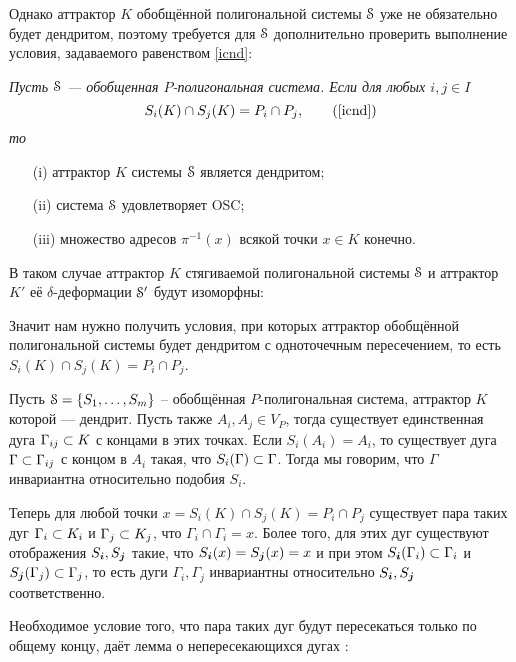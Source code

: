 Однако аттрактор $K$ обобщённой полигональной системы ${\EuScript S}$ уже не обязательно будет дендритом, поэтому требуется для ${\EuScript S}$ дополнительно проверить выполнение условия, задаваемого равенством \eqref{icnd}:\\


{\em Пусть ${\EuScript S}$ --- обобщенная $P$-полигональная система.  
Если для любых $i, j \in I$ 
\begin{equation}
S_i(K)\cap S_j(K)=P_i\cap P_j,\tag{\ref{icnd}}
\end{equation} 
то 
\begin{itemize}[nolistsep]
    \item[(i)] аттрактор $K$ системы ${\EuScript S}$ является дендритом;
    \item[(ii)] система ${\EuScript S}$ удовлетворяет OSC;
    \item[(iii)] множество адресов $\pi^{-1}(x)$ всякой точки $x\in K$ конечно.
\end{itemize}}

В таком случае аттрактор $K$ стягиваемой полигональной системы ${\EuScript S}$ и аттрактор $K'$ её $\delta$-деформации ${\EuScript S}'$ будут изоморфны:


Значит нам нужно получить условия, при которых аттрактор обобщённой полигональной системы будет дендритом с одноточечным пересечением, то есть $S_i(K)\cap S_j(K)=P_i\cap P_j$.


Пусть ${\EuScript S}=\{S_1,\ldots,S_m\}$ -- обобщённая $P$-полигональная система, аттрактор $K$ которой --- дендрит.
Пусть также $A_i,A_j\in V_P$, тогда существует единственная дуга $\Gamma_{ij}\subset K$ с концами в этих точках.
Если $S_i(A_i)=A_i$, то существует дуга $\Gamma\subset\Gamma_{ij}$ с концом в $A_i$ такая, что $S_i(\Gamma)\subset\Gamma$.
Тогда мы говорим, что $\Gamma$ инвариантна относительно подобия $S_i$.

Теперь для любой точки $x=S_i(K)\cap S_j(K)=P_i\cap P_j$ существует пара таких дуг $\Gamma_i\subset K_i$ и $\Gamma_j\subset K_j$, что $\Gamma_i\cap\Gamma_i=x$.
Более того, для этих дуг существуют отображения $S_{\bm{i}}, S_{\bm{j}}$ такие, что $S_{\bm{i}}(x)=S_{\bm{j}}(x)=x$ и при этом $S_{\bm{i}}(\Gamma_i)\subset\Gamma_i$ и $S_{\bm{j}}(\Gamma_j)\subset\Gamma_j$, то есть дуги $\Gamma_i, \Gamma_j$ инвариантны относительно $S_{\bm{i}}, S_{\bm{j}}$ соответственно.

Необходимое условие того, что пара таких дуг будут пересекаться только по общему концу, даёт лемма о непересекающихся дугах \cite{ATK}:

